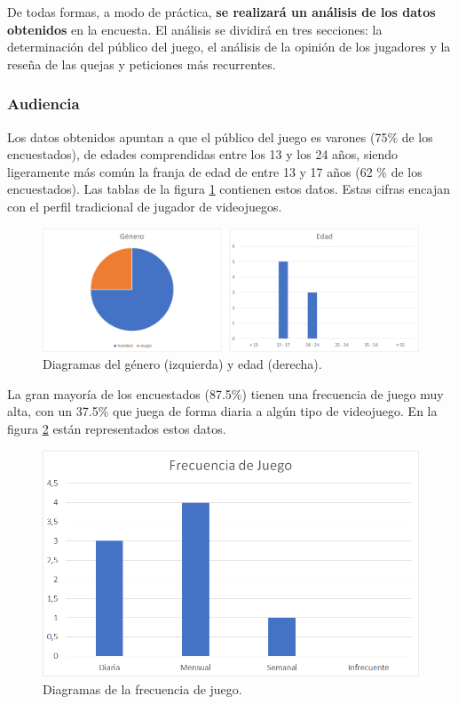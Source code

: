 De todas formas, a modo de práctica, \textbf{se realizará un análisis de los datos obtenidos} en la encuesta. El análisis se dividirá en tres secciones: la determinación del público del juego, el análisis de la opinión de los jugadores y la reseña de las quejas y peticiones más recurrentes.

\subsubsection{Audiencia}
Los datos obtenidos apuntan a que el público del juego es varones (75\% de los encuestados), de edades comprendidas entre los 13 y los 24 años, siendo ligeramente más común la franja de edad de entre 13 y 17 años (62 \% de los encuestados). Las tablas de la figura \ref{genero_edad} contienen estos datos. Estas cifras encajan con el perfil tradicional de jugador de videojuegos. 
\begin{figure}[!t]
   \includegraphics[width=1\linewidth, left]{images/resultados/encuesta/publico}
   \caption{Diagramas del género (izquierda) y edad (derecha).}
   \label{genero_edad}
\end{figure}

La gran mayoría de los encuestados (87.5\%) tienen una frecuencia de juego muy alta, con un 37.5\% que juega de forma diaria a algún tipo de videojuego. En la figura \ref{tabla_frecuencia} están representados estos datos.
\begin{figure}[!t]
   \includegraphics[width=1\linewidth, left]{images/resultados/encuesta/frecuencia}
   \caption{Diagramas de la frecuencia de juego.}
   \label{tabla_frecuencia}
\end{figure}

